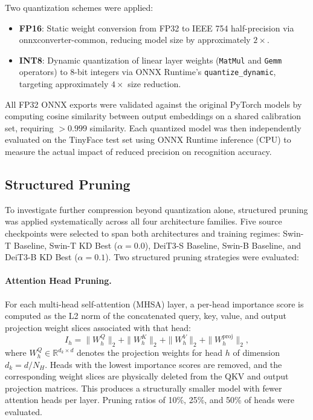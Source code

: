 \documentclass[runningheads,a4paper]{llncs}
\begin{document}
Two quantization schemes were applied:
\begin{itemize}
    \item \textbf{FP16}: Static weight conversion from FP32 to IEEE 754 half-precision via onnxconverter-common, reducing model size by approximately $2\times$.
    \item \textbf{INT8}: Dynamic quantization of linear layer weights (\texttt{MatMul} and \texttt{Gemm} operators) to 8-bit integers via ONNX Runtime's \texttt{quantize\_dynamic}, targeting approximately $4\times$ size reduction.
\end{itemize}
All FP32 ONNX exports were validated against the original PyTorch models by computing cosine similarity between output embeddings on a shared calibration set, requiring $>0.999$ similarity. Each quantized model was then independently evaluated on the TinyFace test set using ONNX Runtime inference (CPU) to measure the actual impact of reduced precision on recognition accuracy.

\subsection{Structured Pruning}\label{sec:pruning-setup}
To investigate further compression beyond quantization alone, structured pruning was applied systematically across all four architecture families. Five source checkpoints were selected to span both architectures and training regimes: Swin-T Baseline, Swin-T KD Best ($\alpha{=}0.0$), DeiT3-S Baseline, Swin-B Baseline, and DeiT3-B KD Best ($\alpha{=}0.1$). Two structured pruning strategies were evaluated:

\paragraph{Attention Head Pruning.}
For each multi-head self-attention (MHSA) layer, a per-head importance score is computed as the L2 norm of the concatenated query, key, value, and output projection weight slices associated with that head:
\[
    I_h = \|W^Q_h\|_2 + \|W^K_h\|_2 + \|W^V_h\|_2 + \|W^{\text{proj}}_h\|_2,
\]
where $W^Q_h \in \mathbb{R}^{d_k \times d}$ denotes the projection weights for head $h$ of dimension $d_k = d/N_H$. Heads with the lowest importance scores are removed, and the corresponding weight slices are physically deleted from the QKV and output projection matrices. This produces a structurally smaller model with fewer attention heads per layer. Pruning ratios of 10\%, 25\%, and 50\% of heads were evaluated.
\end{document}

